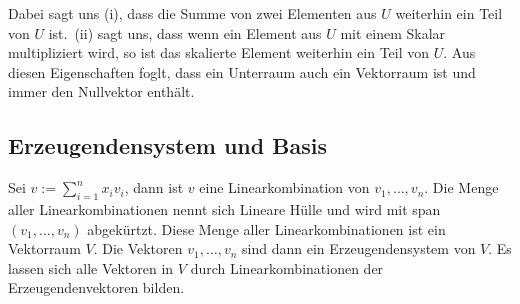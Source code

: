 Dabei sagt uns (i), dass die Summe von zwei Elementen aus \( U \) weiterhin ein Teil von \( U \) ist.\ (ii) sagt uns, dass wenn ein Element aus \( U \) mit einem Skalar multipliziert wird, so ist das skalierte Element weiterhin ein Teil von \( U \). Aus diesen Eigenschaften foglt, dass ein Unterraum auch ein Vektorraum ist und immer den Nullvektor enthält.

\subsection{Erzeugendensystem und Basis}

Sei \( v:= \sum_{i=1}^{n}x_i v_i \), dann ist \( v \) eine Linearkombination von \( v_1, \dots, v_n \). Die Menge aller Linearkombinationen nennt sich Lineare Hülle und wird mit span\( (v_1, \dots, v_n) \) abgekürtzt. Diese Menge aller Linearkombinationen ist ein Vektorraum \( V\). Die Vektoren \( v_1, \dots, v_n \)  sind dann ein Erzeugendensystem von \( V \). Es lassen sich alle Vektoren in \( V \) durch Linearkombinationen der Erzeugendenvektoren bilden. 

